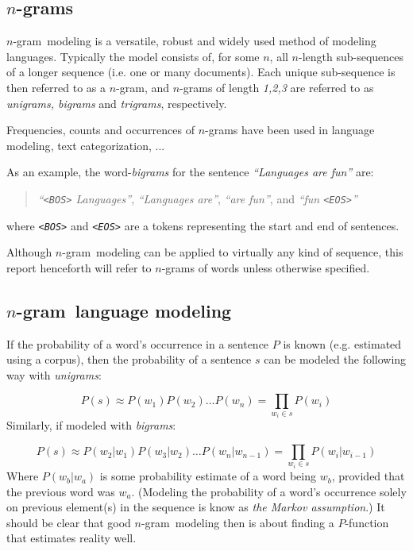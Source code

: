 \documentclass[a4paper,11pt]{kth-mag}
\newcommand{\todo}{ ... }
\newcommand{\ngram}{$n$-gram}
\begin{document}
\subsection{\ngram s}
\label{subsec:ngrams}
\ngram~modeling is a versatile, robust and widely used method of modeling languages. Typically the model consists of, for some $n$, all $n$-length sub-sequences of a longer sequence (i.e. one or many documents). Each unique sub-sequence is then referred to as a \ngram, and \ngram s of length \emph{1,2,3} are referred to as \emph{unigrams, bigrams} and \emph{trigrams}, respectively\cite{ngrams}.

Frequencies, counts and occurrences of \ngram s have been used in language modeling\cite{chen_goodman}, text categorization\cite{ngrams}, \todo

As an example, the word-\emph{bigrams} for the sentence \emph{``Languages are fun''} are:
\begin{quote}
  \vspace*{0.1cm}
  \centering
\emph{``\texttt{<BOS>} Languages''}, \emph{``Languages are''}, \emph{``are fun''}, and \emph{``fun \texttt{<EOS>}''}
\end{quote}
where \emph{\texttt{<BOS>}} and \emph{\texttt{<EOS>}} are a tokens representing the start and end of sentences.

Although \ngram~modeling can be applied to virtually any kind of sequence, this report henceforth will refer to \ngram s of words unless otherwise specified.

\subsection{\ngram~language modeling}
If the probability of a word's occurrence in a sentence $P$ is known (e.g. estimated using a corpus), then the probability of a sentence $s$ can be modeled the following way with \emph{unigrams}:

\begin{equation} \label{eq:unigram_chain_prob}
P(s) \approx P(w_1) P(w_2) \dots P(w_n) =\prod_{w_i \in s}P(w_i)
\end{equation}
Similarly, if modeled with \emph{bigrams}:

\begin{equation} \label{eq:bigram_chain_prob}
P(s) \approx P(w_2 | w_1)P(w_3 | w_2) \dots P(w_n | w_{n-1}) = \prod_{w_i \in s}P(w_i|w_{i-1})
\end{equation}
Where $P(w_b | w_a)$ is some probability estimate of a word being $w_b$, provided that the previous word was $w_a$. (Modeling the probability of a word's occurrence solely on previous element(s) in the sequence is know as \emph{the Markov assumption}.) It should be clear that good \ngram~modeling then is about finding a $P$-function that estimates reality well.
\end{document}
